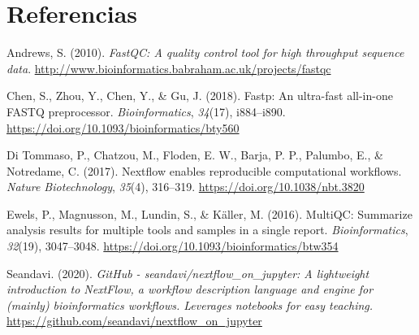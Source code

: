 \documentclass[
  letterpaper,
  DIV=11,
  numbers=noendperiod]{scrartcl}
\newlength{\cslhangindent}
\newenvironment{CSLReferences}[2] %
 {\begin{list}{}{%
  \setlength{\itemindent}{0pt}
  \setlength{\leftmargin}{0pt}
  \setlength{\parsep}{0pt}
  \ifodd #1
   \setlength{\leftmargin}{\cslhangindent}
   \setlength{\itemindent}{-1\cslhangindent}
  \fi
  \setlength{\itemsep}{#2\baselineskip}}}
 {\end{list}}
\begin{document}
\section*{Referencias}\label{referencias}

\label{refs}
\begin{CSLReferences}{1}{0}
Andrews, S. (2010). \emph{FastQC: A quality control tool for high
throughput sequence data}.
\url{http://www.bioinformatics.babraham.ac.uk/projects/fastqc}

Chen, S., Zhou, Y., Chen, Y., \& Gu, J. (2018). Fastp: An ultra-fast
all-in-one FASTQ preprocessor. \emph{Bioinformatics}, \emph{34}(17),
i884--i890. \url{https://doi.org/10.1093/bioinformatics/bty560}

Di Tommaso, P., Chatzou, M., Floden, E. W., Barja, P. P., Palumbo, E.,
\& Notredame, C. (2017). {Nextflow enables reproducible computational
workflows}. \emph{Nature Biotechnology}, \emph{35}(4), 316--319.
\url{https://doi.org/10.1038/nbt.3820}

Ewels, P., Magnusson, M., Lundin, S., \& Käller, M. (2016). MultiQC:
Summarize analysis results for multiple tools and samples in a single
report. \emph{Bioinformatics}, \emph{32}(19), 3047--3048.
\url{https://doi.org/10.1093/bioinformatics/btw354}

Seandavi. (2020). \emph{{GitHub - seandavi/nextflow\_on\_jupyter: A
lightweight introduction to NextFlow, a workflow description language
and engine for (mainly) bioinformatics workflows. Leverages notebooks
for easy teaching.}}
\url{https://github.com/seandavi/nextflow_on_jupyter}

\end{CSLReferences}
\end{document}
